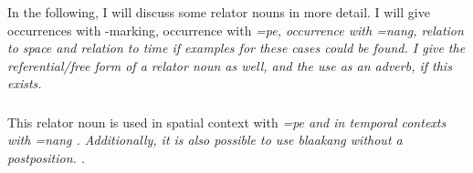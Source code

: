 % 
% 

In the following, I will discuss some relator nouns in more detail. I will give occurrences with \zero{}-marking, occurrence with \em =pe\em, occurrence with \em =nang\em, relation to space and relation to time if examples for these cases could be found. I give the referential/free form of a relator noun as well, and the use as an adverb, if this exists.

\subsubsection{}\label{sec:wc:blaakang}
This relator noun is used in spatial context with \em =pe \em {} and  in temporal contexts with \em =nang \em {}. Additionally, it is also possible to use \em blaakang \em without a postposition. .







